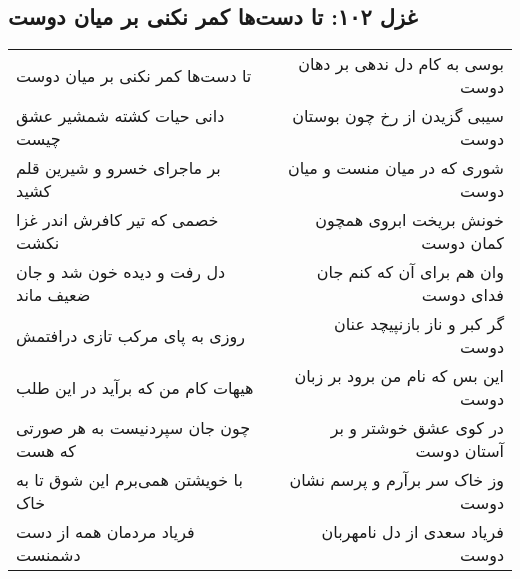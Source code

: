 \begin{center}
\section*{غزل ۱۰۲: تا دست‌ها کمر نکنی بر میان دوست}
\label{sec:102}
\begin{longtable}{l p{0.5cm} r}
تا دست‌ها کمر نکنی بر میان دوست
&&
بوسی به کام دل ندهی بر دهان دوست
\\
دانی حیات کشته شمشیر عشق چیست
&&
سیبی گزیدن از رخ چون بوستان دوست
\\
بر ماجرای خسرو و شیرین قلم کشید
&&
شوری که در میان منست و میان دوست
\\
خصمی که تیر کافرش اندر غزا نکشت
&&
خونش بریخت ابروی همچون کمان دوست
\\
دل رفت و دیده خون شد و جان ضعیف ماند
&&
وان هم برای آن که کنم جان فدای دوست
\\
روزی به پای مرکب تازی درافتمش
&&
گر کبر و ناز بازنپیچد عنان دوست
\\
هیهات کام من که برآید در این طلب
&&
این بس که نام من برود بر زبان دوست
\\
چون جان سپردنیست به هر صورتی که هست
&&
در کوی عشق خوشتر و بر آستان دوست
\\
با خویشتن همی‌برم این شوق تا به خاک
&&
وز خاک سر برآرم و پرسم نشان دوست
\\
فریاد مردمان همه از دست دشمنست
&&
فریاد سعدی از دل نامهربان دوست
\\
\end{longtable}
\end{center}
